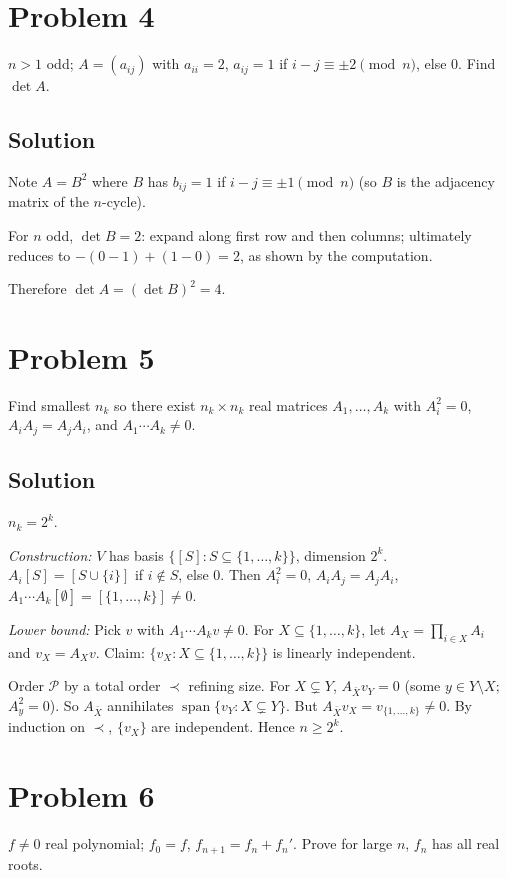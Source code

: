 \documentclass{article}
\begin{document}
\section*{Problem 4}
$n > 1$ odd; $A = (a_{ij})$ with $a_{ii} = 2$, $a_{ij} = 1$ if $i - j \equiv \pm 2 \pmod n$, else $0$. Find $\det A$.

\subsection*{Solution}
Note $A = B^2$ where $B$ has $b_{ij} = 1$ if $i - j \equiv \pm 1 \pmod n$ (so $B$ is the adjacency matrix of the $n$-cycle).

For $n$ odd, $\det B = 2$: expand along first row and then columns; ultimately reduces to $-(0 - 1) + (1 - 0) = 2$, as shown by the computation.

Therefore $\det A = (\det B)^2 = 4$.

\section*{Problem 5}
Find smallest $n_k$ so there exist $n_k \times n_k$ real matrices $A_1, \ldots, A_k$ with $A_i^2 = 0$, $A_i A_j = A_j A_i$, and $A_1 \cdots A_k \ne 0$.

\subsection*{Solution}
$n_k = 2^k$.

\emph{Construction:} $V$ has basis $\{[S] : S \subseteq \{1, \ldots, k\}\}$, dimension $2^k$. $A_i[S] = [S \cup \{i\}]$ if $i \notin S$, else $0$. Then $A_i^2 = 0$, $A_i A_j = A_j A_i$, $A_1 \cdots A_k [\emptyset] = [\{1, \ldots, k\}] \ne 0$.

\emph{Lower bound:} Pick $v$ with $A_1 \cdots A_k v \ne 0$. For $X \subseteq \{1, \ldots, k\}$, let $A_X = \prod_{i \in X} A_i$ and $v_X = A_X v$. Claim: $\{v_X : X \subseteq \{1, \ldots, k\}\}$ is linearly independent.

Order $\mathcal P$ by a total order $\prec$ refining size. For $X \subsetneq Y$, $A_{\bar X} v_Y = 0$ (some $y \in Y \setminus X$; $A_y^2 = 0$). So $A_{\bar X}$ annihilates $\operatorname{span}\{v_Y : X \subsetneq Y\}$. But $A_{\bar X} v_X = v_{\{1, \ldots, k\}} \ne 0$. By induction on $\prec$, $\{v_X\}$ are independent. Hence $n \ge 2^k$.

\section*{Problem 6}
$f \ne 0$ real polynomial; $f_0 = f$, $f_{n+1} = f_n + f_n'$. Prove for large $n$, $f_n$ has all real roots.
\end{document}
